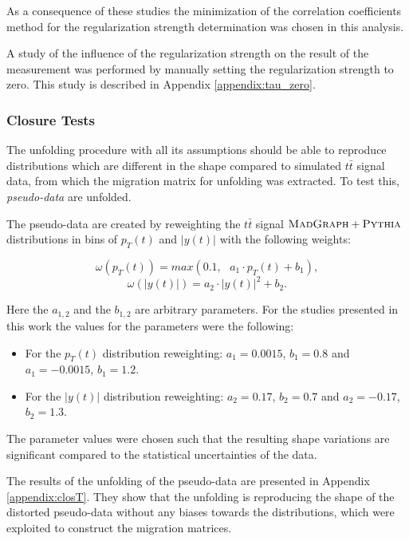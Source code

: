 \begin{itemize}
\end{itemize}

As a consequence of these studies the minimization of the correlation coefficients method for the regularization strength determination was chosen
in this analysis.

A study of the influence of the regularization strength on the result of the measurement was performed by manually setting the regularization strength to
zero. This study is described in Appendix \ref{appendix:tau_zero}.

\subsubsection{Closure Tests}\label{ssec:clT}

The unfolding procedure with all its assumptions should be able to reproduce distributions which are different in the shape compared to simulated $t\bar{t}$ 
signal data, from which the migration matrix for unfolding was extracted. To test this, \textit{pseudo-data} are unfolded.

The pseudo-data are created by reweighting the $t\bar{t}$ signal $\textsc{MadGraph}+\textsc{Pythia}$ distributions in bins of $p_{T}(t)$ and $|y(t)|$ with the following
weights:

\begin{equation}\label{eq:clTw1}
 \omega(p_{T}(t)) = max(0.1,\:\:\:a_{1} \cdot p_{T}(t) + b_{1}),
\end{equation}
\begin{equation}\label{eq:clTw2}
 \omega(|y(t)|) = a_{2} \cdot |y(t)|^{2} + b_{2}.
\end{equation}

Here the $a_{1,2}$ and the $b_{1,2}$ are arbitrary parameters. For the studies presented in this work the values for the parameters were the 
following: 
\begin{itemize}
 \item For the $p_{T}(t)$ distribution reweighting: $a_{1} = 0.0015$, $b_{1} = 0.8$ and $a_{1} = -0.0015$, $b_{1} = 1.2$. 
 \item For the $|y(t)|$ distribution reweighting: $a_{2} = 0.17$, $b_{2} = 0.7$ and $a_{2} = -0.17$, $b_{2} = 1.3$.
\end{itemize}

The parameter values were chosen such that the resulting shape variations are significant compared to the statistical uncertainties of the 
data.

The results of the unfolding of the pseudo-data are presented in Appendix \ref{appendix:closT}. They show that the unfolding is reproducing
the shape of the distorted pseudo-data without any biases towards the distributions, which were exploited to construct the migration matrices.

